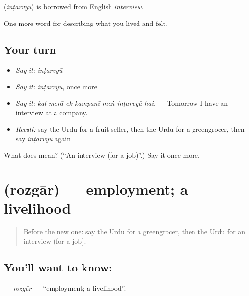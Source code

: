 \begin{cousinweb}
\textbf{} (\emph{inṭarvyū}) is borrowed from English \emph{interview}.
\end{cousinweb}

\begin{grammarlens}[title={What you've built}]
One more word for describing what you lived and felt.
\end{grammarlens}

\subsection*{Your turn}
\begin{itemize}
\raggedright
  \item \emph{Say it:} \emph{inṭarvyū}
  \item \emph{Say it:} \emph{inṭarvyū}, once more
  \item \emph{Say it:} \emph{kal merā ek kampanī meṅ inṭarvyū hai.} — Tomorrow I have an interview at a company.
  \item \emph{Recall:} say the Urdu for a fruit seller, then the Urdu for a greengrocer, then say \emph{inṭarvyū} again
\end{itemize}

\begin{tcolorbox}[breakable,colback=teal!4,colframe=teal!35!black,title={Before you move on}]
What does  mean? (\textquotedblleft{}An interview (for a job)\textquotedblright{}.) Say it once more.
\end{tcolorbox}
\section[\texorpdfstring{\ur{روزگار} (rozgār)}{روزگار (rozgār)}]{ (rozgār) — employment; a livelihood}

\label{lesson:UR-C494-rozgar}



\begin{quote}
Before the new one: say the Urdu for a greengrocer, then the Urdu for an interview (for a job).
\end{quote}

\subsection*{You'll want to know: }
\textbf{} — \emph{rozgār} — \textquotedblleft{}employment; a livelihood\textquotedblright{}.


